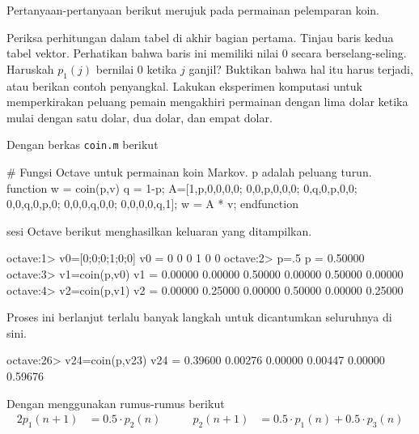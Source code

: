 \begin{exercises}
  \item 
    Pertanyaan-pertanyaan berikut merujuk pada permainan pelemparan koin.
    \begin{exparts}
     \partsitem Periksa perhitungan dalam tabel di akhir bagian pertama.
     \partsitem Tinjau baris kedua tabel vektor.
       Perhatikan bahwa baris ini memiliki nilai $0$ secara berselang-seling.
       Haruskah $p_{1}(j)$ bernilai $0$ ketika $j$ ganjil?
       Buktikan bahwa hal itu harus terjadi, atau berikan contoh penyangkal.
     \partsitem Lakukan eksperimen komputasi untuk memperkirakan peluang pemain
       mengakhiri permainan dengan lima dolar ketika mulai dengan satu dolar,
       dua dolar, dan empat dolar.
    \end{exparts}
    \begin{answer}
      \begin{exparts}
        \partsitem Dengan berkas \texttt{coin.m} berikut
\begin{computercode}         
# Fungsi Octave untuk permainan koin Markov. p adalah peluang turun.
function w = coin(p,v)
  q = 1-p;
  A=[1,p,0,0,0,0;
     0,0,p,0,0,0;
     0,q,0,p,0,0;
     0,0,q,0,p,0;
     0,0,0,q,0,0;
     0,0,0,0,q,1];
  w = A * v;
endfunction
\end{computercode}
         sesi Octave berikut menghasilkan keluaran yang ditampilkan.
\begin{computercode}
octave:1> v0=[0;0;0;1;0;0]
v0 =
  0
  0
  0
  1
  0
  0
octave:2> p=.5
p = 0.50000
octave:3> v1=coin(p,v0)
v1 =
  0.00000
  0.00000
  0.50000
  0.00000
  0.50000
  0.00000
octave:4> v2=coin(p,v1)
v2 =
  0.00000
  0.25000
  0.00000
  0.50000
  0.00000
  0.25000
\end{computercode}
Proses ini berlanjut terlalu banyak langkah untuk dicantumkan seluruhnya di sini.
\begin{computercode}
octave:26> v24=coin(p,v23)
v24 =
  0.39600
  0.00276
  0.00000
  0.00447
  0.00000
  0.59676
\end{computercode}        
        \partsitem Dengan menggunakan rumus-rumus berikut
          \begin{alignat*}{2}
             p_{1}(n+1) &= 0.5\cdot p_{2}(n)
             &\qquad
             p_{2}(n+1) &= 0.5\cdot p_{1}(n)+0.5\cdot p_{3}(n)
                                                              \\

\end{alignat*}
\end{exparts}
\end{answer}
\end{exercises}
